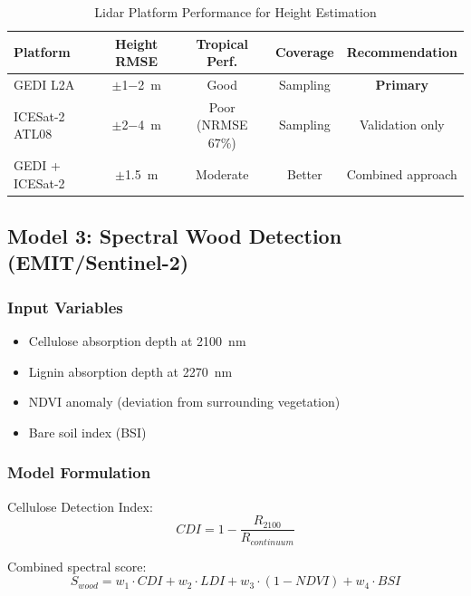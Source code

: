 \documentclass[11pt,letterpaper]{article}
\begin{document}
\begin{table}[h]
\centering
\caption{Lidar Platform Performance for Height Estimation}
\label{tab:lidar_model_performance}
\begin{tabular}{lcccc}
\toprule
\textbf{Platform} & \textbf{Height RMSE} & \textbf{Tropical Perf.} & \textbf{Coverage} & \textbf{Recommendation} \\
\midrule
GEDI L2A & $\pm$\SI{1-2}{m} & Good & Sampling & \textbf{Primary} \\
ICESat-2 ATL08 & $\pm$\SI{2-4}{m} & Poor (NRMSE 67\%) & Sampling & Validation only \\
GEDI + ICESat-2 & $\pm$\SI{1.5}{m} & Moderate & Better & Combined approach \\
\bottomrule
\end{tabular}
\end{table}

\subsection{Model 3: Spectral Wood Detection (EMIT/Sentinel-2)}

\subsubsection{Input Variables}
\begin{itemize}[noitemsep]
    \item Cellulose absorption depth at \SI{2100}{nm}
    \item Lignin absorption depth at \SI{2270}{nm}
    \item NDVI anomaly (deviation from surrounding vegetation)
    \item Bare soil index (BSI)
\end{itemize}

\subsubsection{Model Formulation}

Cellulose Detection Index:
\begin{equation}
CDI = 1 - \frac{R_{2100}}{R_{continuum}}
\end{equation}

Combined spectral score:
\begin{equation}
S_{wood} = w_1 \cdot CDI + w_2 \cdot LDI + w_3 \cdot (1 - NDVI) + w_4 \cdot BSI
\end{equation}
\end{document}
